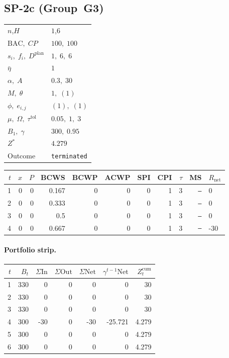 \documentclass[12pt, a4paper]{article}
\newcommand{\BAC}{\mathrm{BAC}}
\begin{document}
\newpage

\subsection*{SP-2c  (Group~G3)}
\begin{center}
\begin{tabular}{ll}
\toprule
$n$,\;$H$ & $1$,\;$6$ \\
$\BAC,\;CP$ & $100,\;100$ \\
$s_i,\;f_i,\;D^{\mathrm{plan}}$ & $1,\;6,\;6$ \\
$\bar\eta$ & $1$ \\
$\alpha,\;A$ & $0.3,\;30$ \\
$M,\;\theta$ & $1,\;(1)$ \\
$\phi,\;e_{i,j}$ & $(1),\;(1)$ \\
$\mu,\;\Omega,\;\tau^{\mathrm{tol}}$ & $0.05,\;1,\;3$ \\
$B_1,\;\gamma$ & $300,\;0.95$ \\
$Z^*$ & $4.279$ \\
Outcome & \texttt{terminated} \\
\bottomrule
\end{tabular}
\end{center}

\begin{center}
\begin{tabular}{rrrrrrrrrrl}
\toprule
$t$ & $x$ & $P$ & BCWS & BCWP & ACWP & SPI & CPI & $\tau$ & MS & $R_{\mathrm{net}}$\\
\midrule
1 & 0 & 0 & 0.167 & 0 & 0 & 0 & 1 & 3 & \texttt{---} & 0 \\
2 & 0 & 0 & 0.333 & 0 & 0 & 0 & 1 & 3 & \texttt{---} & 0 \\
3 & 0 & 0 & 0.5 & 0 & 0 & 0 & 1 & 3 & \texttt{---} & 0 \\
4 & 0 & 0 & 0.667 & 0 & 0 & 0 & 1 & 3 & \texttt{---} & -30 \\
\bottomrule
\end{tabular}
\end{center}
\paragraph{Portfolio strip.}
\begin{center}
\begin{tabular}{rrrrrrr}
\toprule
$t$ & $B_t$ & $\Sigma\mathrm{In}$ & $\Sigma\mathrm{Out}$ & $\Sigma\mathrm{Net}$ & $\gamma^{t-1}\mathrm{Net}$ & $Z_t^{\mathrm{cum}}$\\
\midrule
1 & 330 & 0 & 0 & 0 & 0 & 30 \\
2 & 330 & 0 & 0 & 0 & 0 & 30 \\
3 & 330 & 0 & 0 & 0 & 0 & 30 \\
4 & 300 & -30 & 0 & -30 & -25.721 & 4.279 \\
5 & 300 & 0 & 0 & 0 & 0 & 4.279 \\
6 & 300 & 0 & 0 & 0 & 0 & 4.279 \\
\bottomrule
\end{tabular}
\end{center}
\end{document}
